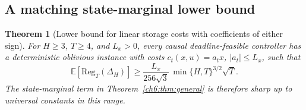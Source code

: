 \documentclass[11pt]{article}
\newcommand{\E}{\mathbb{E}}
\newcommand{\Reg}{\mathrm{Reg}}
\theoremstyle{plain}
\newtheorem{Thm:Theorem}{Theorem}[section]
\theoremstyle{remark}
\numberwithin{equation}{section}
\begin{document}
\subsection{A matching state-marginal lower bound}
\begin{Thm:Theorem}[Lower bound for linear storage costs with coefficients of either sign]\label{ch6:thm:lower-state}
For $H\ge3$, $T\ge4$, and $L_x>0$, every causal deadline-feasible controller
has a deterministic oblivious instance with costs $c_t(x,u)=a_tx$,
$|a_t|\le L_x$, such that
\begin{equation}\label{ch6:eq:lower-state}
 \boxed{\E[\Reg_T(\Delta_H)]\ge
 \frac{L_x}{256\sqrt3}\,\min\{H,T\}^{3/2}\sqrt T.}
\end{equation}
The state-marginal term in Theorem~\ref{ch6:thm:general} is therefore sharp up
to universal constants in this range.
\end{Thm:Theorem}
\end{document}
